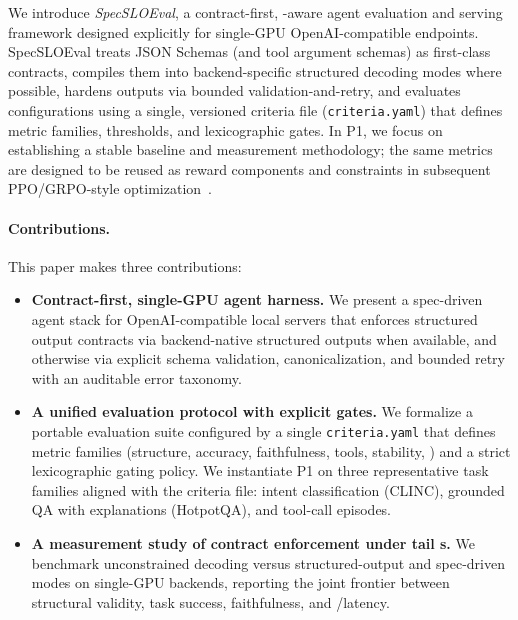 We introduce \emph{SpecSLOEval}, a contract-first, \slo-aware agent evaluation and serving framework designed explicitly for single-GPU OpenAI-compatible endpoints.
SpecSLOEval treats JSON Schemas (and tool argument schemas) as first-class contracts, compiles them into backend-specific structured decoding modes where possible, hardens outputs via bounded validation-and-retry, and evaluates configurations using a single, versioned criteria file (\texttt{criteria.yaml}) that defines metric families, thresholds, and lexicographic gates.
In P1, we focus on establishing a stable baseline and measurement methodology; the same metrics are designed to be reused as reward components and constraints in subsequent PPO/GRPO-style optimization~\citep{schulman2017ppo,grpo,dettmers2023qlora}.

\paragraph{Contributions.}
This paper makes three contributions:

\begin{itemize}[leftmargin=12pt]
    \item \textbf{Contract-first, single-GPU agent harness.}
    We present a spec-driven agent stack for OpenAI-compatible local servers that enforces structured output contracts via backend-native structured outputs when available, and otherwise via explicit schema validation, canonicalization, and bounded retry with an auditable error taxonomy.
    \item \textbf{A unified evaluation protocol with explicit gates.}
    We formalize a portable evaluation suite configured by a single \texttt{criteria.yaml} that defines metric families (structure, accuracy, faithfulness, tools, stability, \slo) and a strict lexicographic gating policy.
    We instantiate P1 on three representative task families aligned with the criteria file: intent classification (CLINC), grounded QA with explanations (HotpotQA), and tool-call episodes.
    \item \textbf{A measurement study of contract enforcement under tail \slo s.}
    We benchmark unconstrained decoding versus structured-output and spec-driven modes on single-GPU backends, reporting the joint frontier between structural validity, task success, faithfulness, and \pninetyfive/\pninetynine latency.
\end{itemize}

